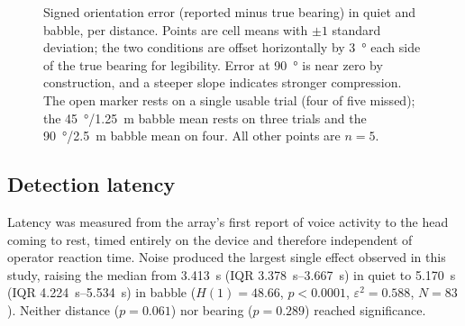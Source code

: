 \begin{figure}[htbp]
  \caption{Signed orientation error (reported minus true bearing) in quiet and
  babble, per distance. Points are cell means with $\pm 1$ standard deviation;
  the two conditions are offset horizontally by \SI{3}{\degree} each side of
  the true bearing for legibility. Error at \SI{90}{\degree} is near zero by
  construction, and a steeper slope indicates stronger compression. The open
  marker rests on a single usable trial (four of five missed); the
  \SI{45}{\degree}/\SI{1.25}{\metre} babble mean rests on three trials and the
  \SI{90}{\degree}/\SI{2.5}{\metre} babble mean on four. All other points are
  $n = 5$.}
  \label{fig:noise}
\end{figure}

\subsection{Detection latency}

Latency was measured from the array's first report of voice activity to the
head coming to rest, timed entirely on the device and therefore independent of
operator reaction time. Noise produced the largest single effect observed in
this study, raising the median from \SI{3.413}{\second}
(IQR \SIrange{3.378}{3.667}{\second}) in quiet to \SI{5.170}{\second}
(IQR \SIrange{4.224}{5.534}{\second}) in babble
($H(1) = 48.66$, $p < 0.0001$, $\varepsilon^2 = 0.588$, $N = 83$). Neither
distance ($p = 0.061$) nor bearing ($p = 0.289$) reached significance.

